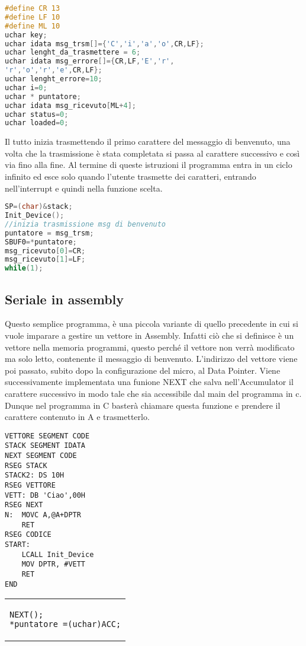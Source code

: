 \documentclass[main.tex]{subfiles}
\begin{document}
\begin{lstlisting}[language=C, caption=Variabili globali]
#define CR 13
#define LF 10
#define ML 10
uchar key;
uchar idata msg_trsm[]={'C','i','a','o',CR,LF};
uchar lenght_da_trasmettere = 6;
uchar idata msg_errore[]={CR,LF,'E','r',
'r','o','r','e',CR,LF};
uchar lenght_errore=10;
uchar i=0;
uchar * puntatore;
uchar idata msg_ricevuto[ML+4];
uchar status=0;
uchar loaded=0;
\end{lstlisting}
Il tutto inizia trasmettendo il primo carattere del messaggio di benvenuto, una volta che la trasmissione è stata completata si passa al carattere successivo e così via fino alla fine.
Al termine di queste istruzioni il programma entra in un ciclo infinito ed esce solo quando l'utente trasmette dei caratteri, entrando nell'interrupt e quindi nella funzione scelta. 
\begin{lstlisting}[language=C, caption=main]
SP=(char)&stack;
Init_Device();
//inizia trasmissione msg di benvenuto
puntatore = msg_trsm; 
SBUF0=*puntatore;
msg_ricevuto[0]=CR;
msg_ricevuto[1]=LF;
while(1);
\end{lstlisting}
\subsection{Seriale in assembly}

Questo semplice programma, è una piccola variante di quello precedente in cui si vuole imparare a gestire un vettore in Assembly. Infatti ciò che si definisce è un vettore nella memoria programmi, questo perché il vettore non verrà modificato ma solo letto, contenente il messaggio di benvenuto. L'indirizzo del vettore viene poi passato, subito dopo la configurazione del micro, al Data Pointer. Viene successivamente implementata una funione NEXT che salva nell'Accumulator il carattere successivo in modo tale che sia accessibile dal main del programma in c. Dunque nel programma in C basterà chiamare questa funzione e prendere il carattere contenuto in A e trasmetterlo. 


\begin{minipage}{0.50\textwidth}
\begin{lstlisting}[caption=Vettore in Assembly]
VETTORE SEGMENT CODE
STACK SEGMENT IDATA
NEXT SEGMENT CODE
RSEG STACK
STACK2: DS 10H
RSEG VETTORE
VETT: DB 'Ciao',00H
RSEG NEXT
N:	MOVC A,@A+DPTR
    RET
RSEG CODICE
START:
	LCALL Init_Device
	MOV DPTR, #VETT
	RET
END
\end{lstlisting}
\end{minipage}%
\hfill
\begin{minipage}{0.50\textwidth}
\begin{tabular}{|p{\textwidth}}
\begin{lstlisting}[caption=codice in C]
NEXT();
*puntatore =(uchar)ACC;
\end{lstlisting}
\end{tabular}
\end{minipage}%
\end{document}
